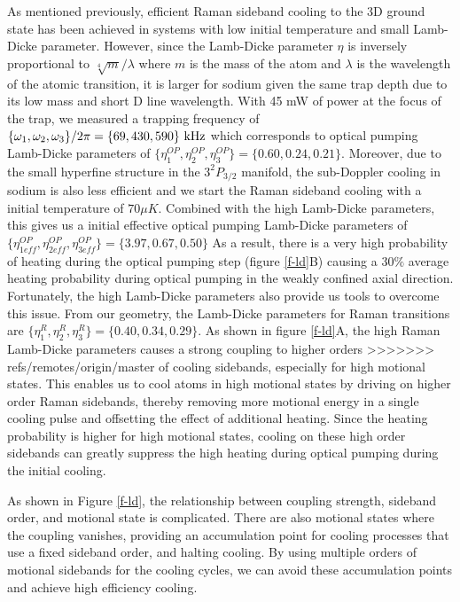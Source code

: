 \documentclass[aps,prl,twocolumn,groupedaddress]{revtex4-1}
\begin{document}
As mentioned previously, efficient Raman sideband cooling to the 3D ground state has been achieved in systems with
low initial temperature and
 small Lamb-Dicke parameter. However, since the Lamb-Dicke parameter $\eta$ is inversely
proportional to $\sqrt[4]{m}/\lambda$ where $m$ is the mass of the atom and $\lambda$
is the wavelength of the atomic transition,
it is larger for sodium given the same trap depth due to its low mass and short D line wavelength.
With 45 mW of power at the focus of the trap, we measured a trapping frequency of
$\{\omega_1,\omega_2,\omega_3\}/2\pi = \{69, 430, 590\}\ \text{\text{kHz}}$
which corresponds to optical pumping Lamb-Dicke parameters of
$\{\eta^{OP}_1,\eta^{OP}_2,\eta^{OP}_3\} = \{0.60, 0.24, 0.21\}$.
Moreover, due to the small hyperfine structure in the $3^2P_{3/2}$ manifold,
the sub-Doppler cooling in sodium is also less efficient and we start the
Raman sideband cooling with a initial temperature of $70\mu K$. Combined with the high Lamb-Dicke
parameters, this gives us a initial effective optical pumping Lamb-Dicke parameters of
$\{\eta^{OP}_{1eff},\eta^{OP}_{2eff},\eta^{OP}_{3eff}\} = \{3.97, 0.67, 0.50\}$
As a result, there is a very high probability of heating during the optical pumping step
(figure \ref{f-ld}B) causing a $30\%$ average heating probability during optical pumping
in the weakly confined axial direction. Fortunately, the high Lamb-Dicke parameters also
provide us tools to overcome this issue. From our geometry, the Lamb-Dicke parameters for
Raman transitions are $\{\eta^R_{1},\eta^R_{2},\eta^R_{3}\} = \{0.40, 0.34, 0.29\}$. As shown in
figure \ref{f-ld}A, the high Raman Lamb-Dicke parameters causes a strong coupling to higher orders
>>>>>>> refs/remotes/origin/master
of cooling sidebands, especially for high motional states.
This enables us to cool atoms in high motional states by driving on higher order Raman sidebands,
thereby removing more motional energy in a single cooling pulse and offsetting the effect of
additional heating. Since the heating probability is higher for high motional states,
cooling on these high order sidebands can greatly suppress the high heating during
optical pumping during the initial cooling. 

As shown in Figure \ref{f-ld}, the relationship between coupling strength, sideband order, and motional state is complicated.  There are also motional states where the coupling vanishes, providing an accumulation point for cooling processes that use a fixed sideband order, and halting cooling.  By using multiple orders of motional sidebands for the cooling cycles, we can avoid these accumulation points and achieve high efficiency cooling.
\end{document}
